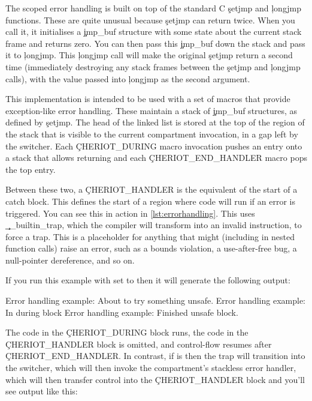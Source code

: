 \begin{note}
	The scoped error handling is built on top of the standard C \c{setjmp} and \c{longjmp} functions.
	These are quite unusual because \c{setjmp} can return twice.
	When you call it, it initialises a \c{jmp_buf} structure with some state about the current stack frame and returns zero.
	You can then pass this \c{jmp_buf} down the stack and pass it to \c{longjmp}.
	This \c{longjmp} call will make the original \c{setjmp} return a second time (immediately destroying any stack frames between the \c{setjmp} and \c{longjmp} calls), with the value passed into \c{longjmp} as the second argument.
\end{note}

This implementation is intended to be used with a set of macros that provide exception-like error handling.
These maintain a stack of \c{jmp_buf} structures, as defined by \c{setjmp}.
The head of the linked list is stored at the top of the region of the stack that is visible to the current compartment invocation, in a gap left by the switcher.
Each \c{CHERIOT_DURING} macro invocation pushes an entry onto a stack that allows returning and each \c{CHERIOT_END_HANDLER} macro pops the top entry.

Between these two, a \c{CHERIOT_HANDLER} is the equivalent of the start of a catch block.
This defines the start of a region where code will run if an error is triggered.
You can see this in action in \ref{lst:errorhandling}.
This uses \c{__builtin_trap}, which the compiler will transform into an invalid instruction, to force a trap.
This is a placeholder for anything that might (including in nested function calls) raise an error, such as a bounds violation, a use-after-free bug, a null-pointer dereference, and so on.


\codelisting[marker=error,caption=Example of using scoped error handling,label=lst:errorhandling, filename=examples/error_handling/errors.cc]{}

If you run this example with  set to  then it will generate the following output:

\begin{console}
Error handling example: About to try something unsafe.
Error handling example: In during block
Error handling example: Finished unsafe block.
\end{console}

The code in the \c{CHERIOT_DURING} block runs, the code in the \c{CHERIOT_HANDLER} block is omitted, and control-flow resumes after \c{CHERIOT_END_HANDLER}.
In contrast, if  is  then the trap will transition into the switcher, which will then invoke the compartment's stackless error handler, which will then transfer control into the \c{CHERIOT_HANDLER} block and you'll see output like this:

